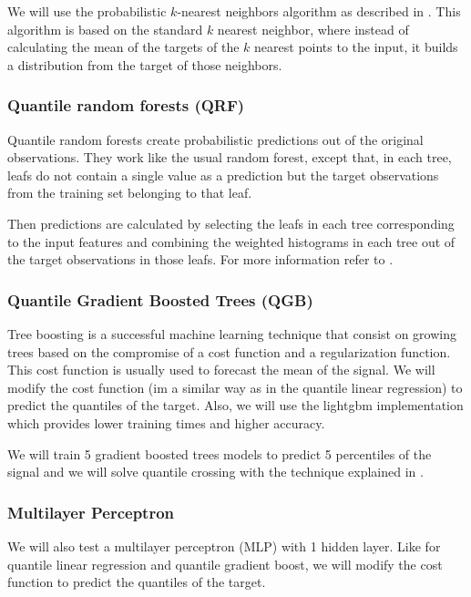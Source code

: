 \documentclass[a4paper,3p,sort&compress]{elsarticle}
\begin{document}
We will use the probabilistic $k$-nearest neighbors algorithm as
described in \cite{quantileknnmangalova}.  This algorithm is based on
the standard $k$ nearest neighbor, where instead of calculating the
mean of the targets of the $k$ nearest points to the input, it builds
a distribution from the target of those neighbors.

\subsubsection{Quantile random forests (QRF)}

Quantile random forests create probabilistic predictions out of the
original observations. They work like the usual random forest, except
that, in each tree, leafs do not contain a single value as a
prediction but the target observations from the training set belonging
to that
leaf.

Then predictions are calculated by selecting the leafs in each tree
corresponding to the input features and combining the weighted
histograms in each tree out of the target observations in those leafs.
For more information refer to \cite{quantregforests}.

\subsubsection{Quantile Gradient Boosted Trees (QGB)}

Tree boosting \cite{friedman_greedy_2001} is a successful
machine learning technique that consist on growing trees based on the
compromise of a cost function and a regularization function. This cost
function is usually used to forecast the mean of the signal. We will
modify the cost function (im a similar way as in the quantile linear
regression) to predict the quantiles of the target. Also, we will use 
the lightgbm implementation \cite{ke_lightgbm:_2017} which provides 
lower training times and higher accuracy.

We will train 5 gradient boosted trees models to predict 5 percentiles
of the \no signal and we will solve quantile 
crossing with the technique
explained in \cite{cross}.

\subsubsection{Multilayer Perceptron}

We will also test a multilayer perceptron (MLP) 
\cite{ramchoun_multilayer_2016} with 1 hidden layer. 
Like for quantile linear regression and quantile gradient boost, 
we will modify the cost function to predict the quantiles of the target.
\end{document}
